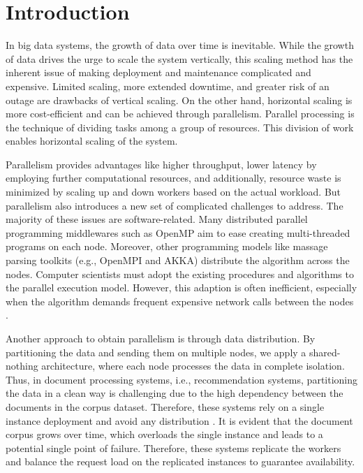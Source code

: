 \chapter{Introduction}

In big data systems, the growth of data over time is inevitable. While the growth of data drives the urge to scale the system vertically, this scaling method has the inherent issue of making deployment and maintenance complicated and expensive. Limited scaling, more extended downtime, and greater risk of an outage are drawbacks of vertical scaling. On the other hand, horizontal scaling is more cost-efficient and can be achieved through parallelism. Parallel processing is the technique of dividing tasks among a group of resources. This division of work enables horizontal scaling of the system.


Parallelism provides advantages like higher throughput, lower latency by employing further computational resources, and additionally, resource waste is minimized by scaling up and down workers based on the actual workload. But parallelism also introduces a new set of complicated challenges to address. The majority of these issues are software-related. Many distributed parallel programming middlewares such as OpenMP aim to ease creating multi-threaded programs on each node. Moreover, other programming models like massage parsing toolkits (e.g., OpenMPI and AKKA) distribute the algorithm across the nodes. Computer scientists must adopt the existing procedures and algorithms to the parallel execution model. However, this adaption is often inefficient, especially when the algorithm demands frequent expensive network calls between the nodes \cite{sharmaGraphJetRealtimeContent2016, eksombatchaiPixieSystemRecommending2018}.


Another approach to obtain parallelism is through data distribution. By partitioning the data and sending them on multiple nodes, we apply a shared-nothing architecture, where each node processes the data in complete isolation. Thus, in document processing systems, i.e., recommendation systems, partitioning the data in a clean way is challenging due to the high dependency between the documents in the corpus dataset. Therefore, these systems rely on a single instance deployment and avoid any distribution \cite{guptaWTFWhoFollow2013,sharmaGraphJetRealtimeContent2016, eksombatchaiPixieSystemRecommending2018}. It is evident that the document corpus grows over time, which overloads the single instance and leads to a potential single point of failure. Therefore, these systems replicate the workers and balance the request load on the replicated instances to guarantee availability.



